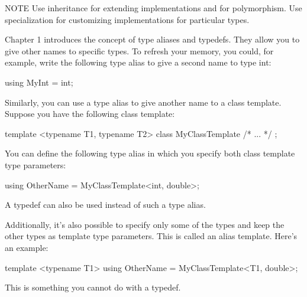 \begin{myNotic}{NOTE}
Use inheritance for extending implementations and for polymorphism. Use specialization for customizing implementations for particular types.
\end{myNotic}


Chapter 1 introduces the concept of type aliases and typedefs. They allow you to give other names to specific types. To refresh your memory, you could, for example, write the following type alias to give a second name to type int:

\begin{cpp}
using MyInt = int;
\end{cpp}

Similarly, you can use a type alias to give another name to a class template. Suppose you have the following class template:

\begin{cpp}
template <typename T1, typename T2>
class MyClassTemplate { /* ... */ };
\end{cpp}

You can define the following type alias in which you specify both class template type parameters:

\begin{cpp}
using OtherName = MyClassTemplate<int, double>;
\end{cpp}

A typedef can also be used instead of such a type alias.

Additionally, it’s also possible to specify only some of the types and keep the other types as template type parameters. This is called an alias template. Here’s an example:

\begin{cpp}
template <typename T1>
using OtherName = MyClassTemplate<T1, double>;
\end{cpp}

This is something you cannot do with a typedef.









